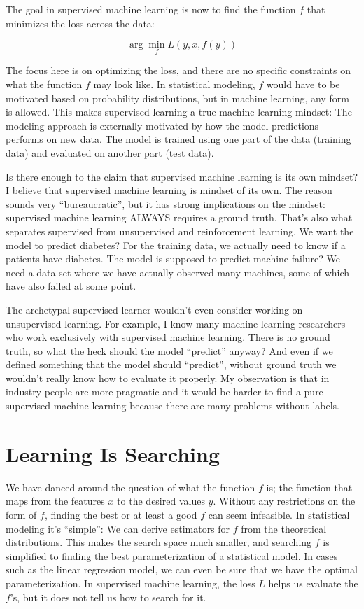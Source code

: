 \documentclass[
  10pt,
]{scrbook}
\begin{document}
The goal in supervised machine learning is now to find the function \(f\) that minimizes the loss across the data:

\[\arg \min_{f} L(y, x, f(y))\]

The focus here is on optimizing the loss, and there are no specific constraints on what the function \(f\) may look like.
In statistical modeling, \(f\) would have to be motivated based on probability distributions, but in machine learning, any form is allowed.
This makes supervised learning a true machine learning mindset:
The modeling approach is externally motivated by how the model predictions performs on new data.
The model is trained using one part of the data (training data) and evaluated on another part (test data).

Is there enough to the claim that supervised machine learning is its own mindset?
I believe that supervised machine learning is mindset of its own.
The reason sounds very ``bureaucratic'', but it has strong implications on the mindset: supervised machine learning ALWAYS requires a ground truth.
That's also what separates supervised from unsupervised and reinforcement learning.
We want the model to predict diabetes? For the training data, we actually need to know if a patients have diabetes.
The model is supposed to predict machine failure? We need a data set where we have actually observed many machines, some of which have also failed at some point.

The archetypal supervised learner wouldn't even consider working on unsupervised learning.
For example, I know many machine learning researchers who work exclusively with supervised machine learning.
There is no ground truth, so what the heck should the model ``predict'' anyway?
And even if we defined something that the model should ``predict'', without ground truth we wouldn't really know how to evaluate it properly.
My observation is that in industry people are more pragmatic and it would be harder to find a pure supervised machine learning because there are many problems without labels.

\hypertarget{learning-is-searching}{%
\section{Learning Is Searching}\label{learning-is-searching}}

We have danced around the question of what the function \(f\) is; the function that maps from the features \(x\) to the desired values \(y\).
Without any restrictions on the form of \(f\), finding the best or at least a good \(f\) can seem infeasible.
In statistical modeling it's ``simple'':
We can derive estimators for \(f\) from the theoretical distributions.
This makes the search space much smaller, and searching \(f\) is simplified to finding the best parameterization of a statistical model.
In cases such as the linear regression model, we can even be sure that we have the optimal parameterization.
In supervised machine learning, the loss \(L\) helps us evaluate the \(f\)'s, but it does not tell us how to search for it.
\end{document}
